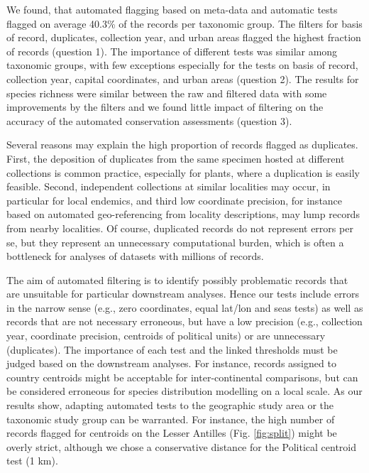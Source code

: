 \documentclass[
  12pt,
]{article}
\begin{document}
We found, that automated flagging based on meta-data and automatic tests flagged on average 40.3\% of the records per taxonomic group. The filters for basis of record, duplicates, collection year, and urban areas flagged the highest fraction of records (question 1). The importance of different tests was similar among taxonomic groups, with few exceptions especially for the tests on basis of record, collection year, capital coordinates, and urban areas (question 2). The results for species richness were similar between the raw and filtered data with some improvements by the filters and we found little impact of filtering on the accuracy of the automated conservation assessments (question 3).

Several reasons may explain the high proportion of records flagged as duplicates. First, the deposition of duplicates from the same specimen hosted at different collections is common practice, especially for plants, where a duplication is easily feasible. Second, independent collections at similar localities may occur, in particular for local endemics, and third low coordinate precision, for instance based on automated geo-referencing from locality descriptions, may lump records from nearby localities. Of course, duplicated records do not represent errors per se, but they represent an unnecessary computational burden, which is often a bottleneck for analyses of datasets with millions of records.

The aim of automated filtering is to identify possibly problematic records that are unsuitable for particular downstream analyses. Hence our tests include errors in the narrow sense (e.g., zero coordinates, equal lat/lon and seas tests) as well as records that are not necessary erroneous, but have a low precision (e.g., collection year, coordinate precision, centroids of political units) or are unnecessary (duplicates). The importance of each test and the linked thresholds must be judged based on the downstream analyses. For instance, records assigned to country centroids might be acceptable for inter-continental comparisons, but can be considered erroneous for species distribution modelling on a local scale. As our results show, adapting automated tests to the geographic study area or the taxonomic study group can be warranted. For instance, the high number of records flagged for centroids on the Lesser Antilles (Fig. \ref{fig:split}) might be overly strict, although we chose a conservative distance for the Political centroid test (1 km).
\end{document}
